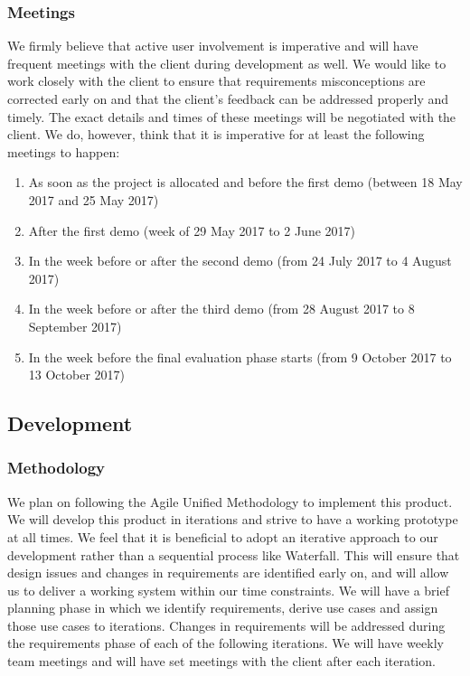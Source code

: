 \documentclass{article}
\begin{document}
        \subsubsection{Meetings}
            We firmly believe that active user involvement is imperative and will have frequent meetings with the client during development as well. We would like to work closely with the client to ensure that requirements misconceptions are corrected early on and that the client's feedback can be addressed properly and timely. The exact details and times of these meetings will be negotiated with the client. We do, however, think that it is imperative for at least the following meetings to happen:
            \begin{enumerate}
                \item As soon as the project is allocated and before the first demo (between 18 May 2017 and 25 May 2017)
                \item After the first demo (week of 29 May 2017 to 2 June 2017)
                \item In the week before or after the second demo (from 24 July 2017 to 4 August 2017)
                \item In the week before or after the third demo (from 28 August 2017 to 8 September 2017)
                \item In the week before the final evaluation phase starts (from 9 October 2017 to 13 October 2017)
            \end{enumerate}
    \subsection{Development}
        \subsubsection{Methodology}
        We plan on following the Agile Unified Methodology to implement this product. We will develop this product in iterations and strive to have a working prototype at all times. We feel that it is beneficial to adopt an iterative approach to our development rather than a sequential process like Waterfall. This will ensure that design issues and changes in requirements are identified early on, and will allow us to deliver a working system within our time constraints. We will have a brief planning phase in which we identify requirements, derive use cases and assign those use cases to iterations. Changes in requirements will be addressed during the requirements phase of each of the following iterations. We will have weekly team meetings and will have set meetings with the client after each iteration.
        \newpage
\end{document}
